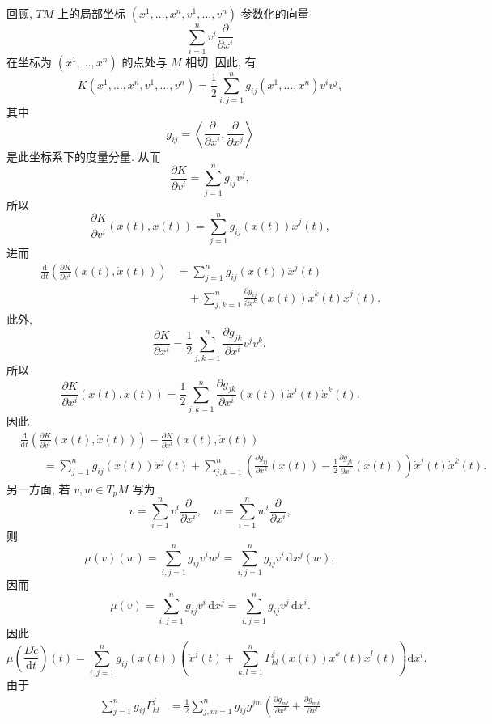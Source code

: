 \begin{description}[font=\normalfont,leftmargin=2em,labelwidth=1.5em]
回顾, $TM$ 上的局部坐标 $(x^1,\ldots,x^n,v^1,\ldots,v^n)$ 参数化的向量
\[
  \sum_{i=1}^nv^i\frac{\partial}{\partial x^i}
\]
在坐标为 $(x^1,\ldots,x^n)$ 的点处与 $M$ 相切. 因此, 有
\[
  K(x^1,\ldots,x^n,v^1,\ldots,v^n)=\frac12\sum_{i,j=1}^n g_{ij}(x^1,\ldots,x^n)v^iv^j,
\]
其中
\[
  g_{ij}=\left\langle\frac{\partial}{\partial x^i},\frac{\partial}{\partial x^j}\right\rangle
\]
是此坐标系下的度量分量. 从而
\[
  \frac{\partial K}{\partial v^i}=\sum_{j=1}^n g_{ij}v^j,
\]
所以
\[
  \frac{\partial K}{\partial v^i}(x(t),\dot{x}(t))=\sum_{j=1}^n g_{ij}(x(t))\dot{x}^j(t),
\]
进而
\begin{align*}
  \frac{\mathrm{d}}{\mathrm{d}t}
   \left(\frac{\partial K}{\partial v^i}(x(t),\dot{x}(t))\right)
  &=\sum_{j=1}^n g_{ij}(x(t))\ddot{x}^j(t)\\
  &\quad+\sum_{j,k=1}^n\frac{\partial g_{ij}}{\partial x^k}(x(t))\dot{x}^k(t)\dot{x}^j(t).
\end{align*}
此外,
\[
  \frac{\partial K}{\partial x^i}=\frac12\sum_{j,k=1}^n
   \frac{\partial g_{jk}}{\partial x^i}v^jv^k,
\]
所以
\[
  \frac{\partial K}{\partial x^i}(x(t),\dot{x}(t))
    =\frac12\sum_{j,k=1}^n\frac{\partial g_{jk}}{\partial x^i}(x(t))\dot{x}^j(t)\dot{x}^k(t).
\]
因此
\begin{align*}
  &\frac{\mathrm{d}}{\mathrm{d}t}
   \left(\frac{\partial K}{\partial v^i}(x(t),\dot{x}(t))\right)
   -\frac{\partial K}{\partial x^i}(x(t),\dot{x}(t))\\
  &\qquad=\sum_{j=1}^n g_{ij}(x(t))\ddot{x}^j(t)
    +\sum_{j,k=1}^n\left(\frac{\partial g_{ij}}{\partial x^k}(x(t))
       -\frac12\frac{\partial g_{jk}}{\partial x^i}(x(t))\right)\dot{x}^j(t)\dot{x}^k(t).
\end{align*}
另一方面, 若 $v,w\in T_pM$ 写为
\[
  v=\sum_{i=1}^nv^i\frac{\partial}{\partial x^i},\quad
  w=\sum_{i=1}^nw^i\frac{\partial}{\partial x^i},
\]
则
\[
  \mu(v)(w)=\sum_{i,j=1}^n g_{ij}v^i w^j
      =\sum_{i,j=1}^n g_{ij}v^i\,\mathrm{d}x^j(w),
\]
因而
\[
  \mu(v)=\sum_{i,j=1}^n g_{ij}v^i\,\mathrm{d}x^j
     =\sum_{i,j=1}^n g_{ij}v^j\,\mathrm{d}x^i.
\]
因此
\[
  \mu\left(\frac{D\dot c}{\mathrm{d}t}\right)(t)
  =\sum_{i,j=1}^n g_{ij}(x(t))
   \left(\ddot{x}^j(t)+\sum_{k,l=1}^n\Gamma^j_{kl}(x(t))\dot{x}^k(t)\dot{x}^l(t)\right)\mathrm{d}x^i.
\]
由于
\begin{align*}
  \sum_{j=1}^n g_{ij}\Gamma^j_{kl}
  &=\frac12\sum_{j,m=1}^n g_{ij}g^{jm}
     \left(\frac{\partial g_{ml}}{\partial x^k}+\frac{\partial g_{mk}}{\partial x^l}

\end{align*}
\end{description}
